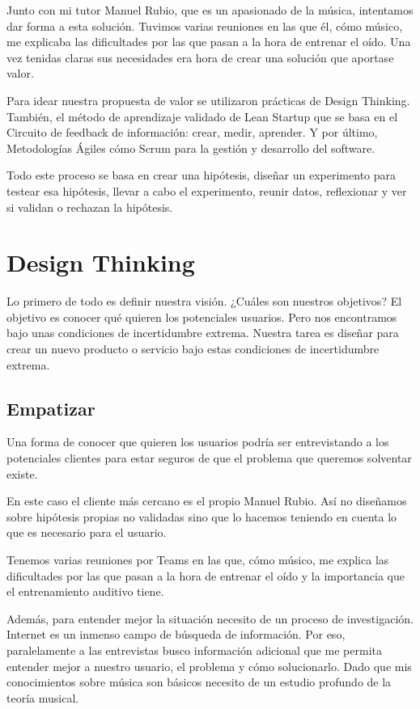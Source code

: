 \documentclass[12pt,twoside,titlepage]{report}
\begin{document}
{Junto con mi tutor Manuel Rubio, que es un apasionado de la música, intentamos dar forma a esta solución. Tuvimos varias reuniones en las que él, cómo músico, me explicaba las dificultades por las que pasan a la hora de entrenar el oído. Una vez tenidas claras sus necesidades era hora de crear una solución que aportase valor.

Para idear nuestra propuesta de valor se utilizaron prácticas de Design Thinking. También, el método de aprendizaje validado de Lean Startup que se basa en el Circuito de feedback de información: crear, medir, aprender. Y por último, Metodologías Ágiles cómo Scrum para la gestión y desarrollo del software.

Todo este proceso se basa en crear una hipótesis, diseñar un experimento para testear esa hipótesis, llevar a cabo el experimento, reunir datos, reflexionar y ver si validan o rechazan la hipótesis.

\section{Design Thinking}
\label{sec:DesignThinking}
Lo primero de todo es definir nuestra visión. ¿Cuáles son nuestros objetivos? El objetivo es conocer qué quieren los potenciales usuarios. Pero nos encontramos bajo unas condiciones de incertidumbre extrema. Nuestra tarea es diseñar para crear un nuevo producto o servicio bajo estas condiciones de incertidumbre extrema.

\subsection{Empatizar}

Una forma de conocer que quieren los usuarios podría ser entrevistando a los potenciales clientes para estar seguros de que el problema que queremos solventar existe.

En este caso el cliente más cercano es el propio Manuel Rubio. Así no diseñamos sobre hipótesis propias no validadas sino que lo hacemos teniendo en cuenta lo que es necesario para el usuario.

Tenemos varias reuniones por Teams en las que, cómo músico, me explica las dificultades por las que pasan a la hora de entrenar el oído y la importancia que el entrenamiento auditivo tiene.

Además, para entender mejor la situación necesito de un proceso de investigación. Internet es un inmenso campo de búsqueda de información. Por eso, paralelamente a las entrevistas busco información adicional que me permita entender mejor a nuestro usuario, el problema y cómo solucionarlo. Dado que mis conocimientos sobre música son básicos necesito de un estudio profundo de la teoría musical. 

}
\end{document}
